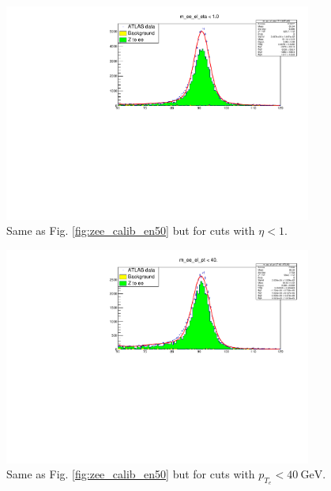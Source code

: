 \documentclass[a4paper]{report}
\numberwithin{equation}{section}
\begin{document}
\begin{figure}[htpb]
    \centering
    \includegraphics[width=0.9\textwidth]{zeefit_eleta1.pdf}
    \caption{Same as Fig. \ref*{fig:zee_calib_en50} but for cuts with $\eta < 1$.}
    \label{fig:zee_calib_eta1}
\end{figure}

\begin{figure}[htpb]
    \centering
    \includegraphics[width=0.9\textwidth]{zeefit_elpt40.pdf}
    \caption{Same as Fig. \ref*{fig:zee_calib_en50} but for cuts with $p_{T_e} < \SI{40}{\giga\electronvolt}$.}
    \label{fig:zee_calib_pt40}
\end{figure}
\end{document}
